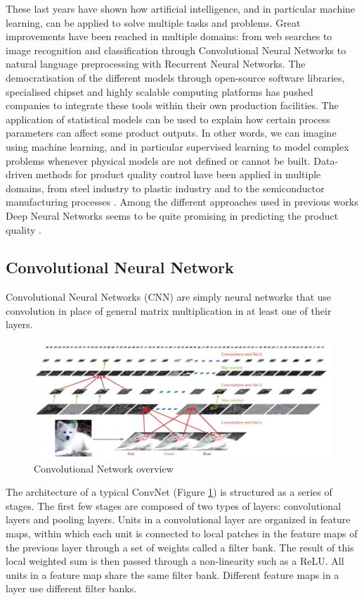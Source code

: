 These last years have shown how artificial intelligence, and in particular machine learning, can be applied to solve multiple tasks and problems. Great improvements have been reached  in multiple domains: from web searches to image recognition and classification through Convolutional Neural Networks to natural language preprocessing with Recurrent Neural Networks. The democratisation of the different models through open-source software libraries, specialised chipset and highly scalable computing platforms has pushed companies to integrate these tools within their own production facilities.
The application of statistical models can be used to explain how certain process parameters can affect some product outputs. In other words, we can imagine using machine learning, and in particular supervised learning to model complex problems whenever physical models are not defined or cannot be built. Data-driven methods for product quality control have been applied in multiple domains, from steel industry \citep{lieber2013quality} \citep{li2018ensemble} to plastic industry \citep{chen2008neural} \citep{nagorny2017quality} \citep{haeussler1996quality} and to the semiconductor manufacturing processes \citep{melhem2016regression}. Among the different approaches used in previous works Deep Neural Networks seems to be quite promising in predicting the product quality \citep{bai2017deep}. 

\subsection{Convolutional Neural Network} \label{Convolutional Neural Network}

Convolutional Neural Networks (CNN) are simply neural networks that use convolution in place of general matrix multiplication in at least one of their layers. 
\begin{figure}
\centerline{\includegraphics[scale=0.7]{images/chapter_2/CNN.jpg}}
\caption{Convolutional Network overview \citep{DBLP:journals/nature/LeCunBH15}}
\label{fig:cnn_overview}
\end{figure}
The architecture of a typical ConvNet (Figure \ref{fig:cnn_overview}) is structured as a series of stages. The first few stages are composed of two types of layers: convolutional layers and pooling layers. Units in a convolutional layer are organized in feature maps, within which each unit is connected to local patches in the feature maps of the previous layer through a set of weights called a filter bank. The result of this local weighted sum is then passed through a non-linearity such as a ReLU. All units in a feature map share the same filter bank. Different feature maps in a layer use different filter banks.

